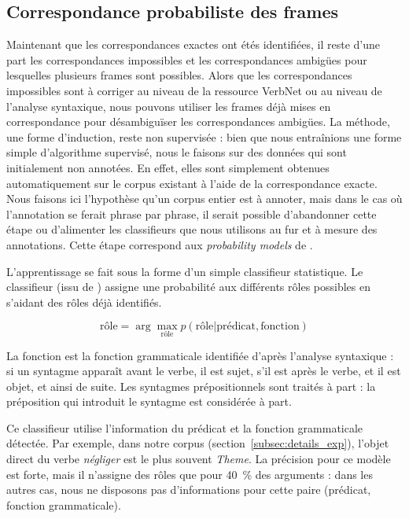 \subsection{Correspondance probabiliste des frames}
\label{subsec:probability}

Maintenant que les correspondances exactes ont étés identifiées, il reste d'une
part les correspondances impossibles et les correspondances ambigües pour
lesquelles plusieurs frames sont possibles. Alors que les correspondances
impossibles sont à corriger au niveau de la ressource VerbNet ou au niveau de
l'analyse syntaxique, nous pouvons utiliser les frames déjà mises en
correspondance pour désambiguïser les correspondances ambigües. La méthode, une
forme d'induction, reste non supervisée : bien que nous entraînions une forme
simple d'algorithme supervisé, nous le faisons sur des données qui sont
initialement non annotées.  En effet, elles sont simplement obtenues
automatiquement sur le corpus existant à l'aide de la correspondance exacte.
Nous faisons ici l'hypothèse qu'un corpus entier est à annoter, mais dans le
cas où l'annotation se ferait phrase par phrase, il serait possible
d'abandonner cette étape ou d'alimenter les classifieurs que nous utilisons au
fur et à mesure des annotations. Cette étape correspond aux \textit{probability
models} de \citet{swier2004unsupervised}.

L'apprentissage se fait sous la forme d'un simple classifieur statistique. Le
classifieur (issu de \cite{swier2004unsupervised}) assigne une probabilité aux
différents rôles possibles en s'aidant des rôles déjà identifiés.

$$ \text{rôle} = \arg\max_{\text{rôle}} p(\text{rôle} \vert \text{prédicat}, \text{fonction})$$

La fonction est la fonction grammaticale identifiée d'après l'analyse
syntaxique : si un syntagme apparaît avant le verbe, il est sujet, s'il est
après le verbe, et il est objet, et ainsi de suite. Les syntagmes
prépositionnels sont traités à part : la préposition qui introduit le syntagme
est considérée à part.

Ce classifieur utilise l'information du prédicat et la fonction grammaticale
détectée. Par exemple, dans notre corpus (section~\ref{subsec:details_exp}),
l'objet direct du verbe \textit{négliger} est le plus souvent \textit{Theme}. La
précision pour ce modèle est forte, mais il n'assigne des rôles que pour 40~\%
des arguments : dans les autres cas, nous ne disposons pas d'informations pour
cette paire (prédicat, fonction grammaticale).

